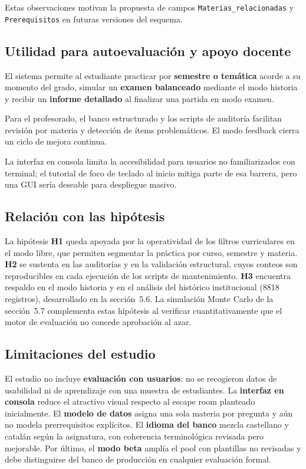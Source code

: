 \documentclass[11pt,a4paper]{article}
\begin{document}
Estas observaciones motivan la propuesta de campos \texttt{Materias\_relacionadas} y \texttt{Prerequisitos} en futuras versiones del esquema.

\subsection{Utilidad para autoevaluación y apoyo docente}

El sistema permite al estudiante practicar por \textbf{semestre o temática} acorde a su momento del grado, simular un \textbf{examen balanceado} mediante el modo historia y recibir un \textbf{informe detallado} al finalizar una partida en modo examen.

Para el profesorado, el banco estructurado y los scripts de auditoría facilitan revisión por materia y detección de ítems problemáticos. El modo feedback cierra un ciclo de mejora continua.

La interfaz en consola limita la accesibilidad para usuarios no familiarizados con terminal; el tutorial de foco de teclado al inicio mitiga parte de esa barrera, pero una GUI sería deseable para despliegue masivo.

\subsection{Relación con las hipótesis}

La hipótesis \textbf{H1} queda apoyada por la operatividad de los filtros curriculares en el modo libre, que permiten segmentar la práctica por curso, semestre y materia. \textbf{H2} se sustenta en las auditorías y en la validación estructural, cuyos conteos son reproducibles en cada ejecución de los scripts de mantenimiento. \textbf{H3} encuentra respaldo en el modo historia y en el análisis del histórico institucional (8818 registros), desarrollado en la sección~5.6. La simulación Monte Carlo de la sección~5.7 complementa estas hipótesis al verificar cuantitativamente que el motor de evaluación no concede aprobación al azar.

\subsection{Limitaciones del estudio}

El estudio no incluye \textbf{evaluación con usuarios}: no se recogieron datos de usabilidad ni de aprendizaje con una muestra de estudiantes. La \textbf{interfaz en consola} reduce el atractivo visual respecto al escape room planteado inicialmente. El \textbf{modelo de datos} asigna una sola materia por pregunta y aún no modela prerrequisitos explícitos. El \textbf{idioma del banco} mezcla castellano y catalán según la asignatura, con coherencia terminológica revisada pero mejorable. Por último, el \textbf{modo beta} amplía el pool con plantillas no revisadas y debe distinguirse del banco de producción en cualquier evaluación formal.
\end{document}
